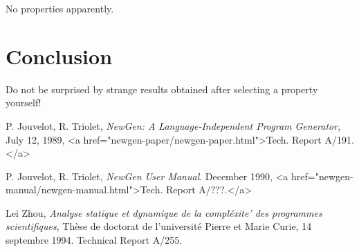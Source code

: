 No properties apparently.

\section*{Conclusion}

Do not be surprised by strange results obtained after selecting a
property yourself!

\begin{thebibliography}{99}

 P. Jouvelot, R. Triolet, 
{\em NewGen: A Language-Independent Program Generator},
July 12, 1989, 
<a href="newgen-paper/newgen-paper.html">Tech. Report A/191.</a>

 P. Jouvelot, R. Triolet, 
{\em NewGen User Manual}. December
1990, <a href="newgen-manual/newgen-manual.html">Tech. Report A/???.</a>

 Lei Zhou,
{\em Analyse statique et dynamique de la compl\'exite' des programmes
scientifiques}, 
Th\`ese de doctorat de l'universit\'e Pierre et Marie Curie, 14
septembre 1994. Technical Report A/255.

\end{thebibliography}


